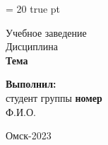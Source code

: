 \baselineskip = 20 true pt \vspace{40mm} \large
\begin{titlepage}
\begin{center}
Учебное заведение\\[4.5cm]

Дисциплина\\[3cm]

{\large{\textbf{Тема}}}\\[4cm]
\end{center}

\begin{flushright}
\textbf{Выполнил:}\\
студент группы \textbf{номер}\\
Ф.И.О.\\[6cm]
\end{flushright}

\begin{center}
Омск-2023
\end{center}
\end{titlepage}

